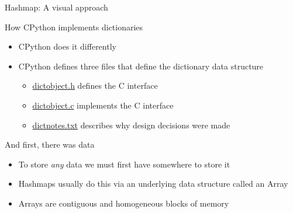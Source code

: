 \documentclass[12pt, aspectration=1610]{beamer}
\begin{document}
\begin{frame}{Hashmap: A visual approach}
    \end{frame}
    \begin{frame}{How CPython implements dictionaries}
        \begin{itemize}
            \item CPython does it differently
            \item CPython defines three files that define the dictionary data structure
                \begin{itemize}
                    \item \href{https://github.com/python/cpython/blob/3.12/Include/dictobject.h}{dictobject.h} defines the C interface
                    \item \href{https://github.com/python/cpython/blob/3.12/Objects/dictobject.c}{dictobject.c} implements the C interface 
                    \item \href{https://github.com/python/cpython/blob/3.12/Objects/dictnotes.txt}{dictnotes.txt} describes why design decisions were made
                \end{itemize}
        \end{itemize}
    \end{frame}

    \begin{frame}{And first, there was data}
        \begin{itemize}
            \item To store \textit{any} data we must first have somewhere to store it
            \item Hashmaps usually do this via an underlying data structure called an Array
            \item Arrays are contiguous and homogeneous blocks of memory
        \end{itemize}
    \end{frame}
\end{document}
